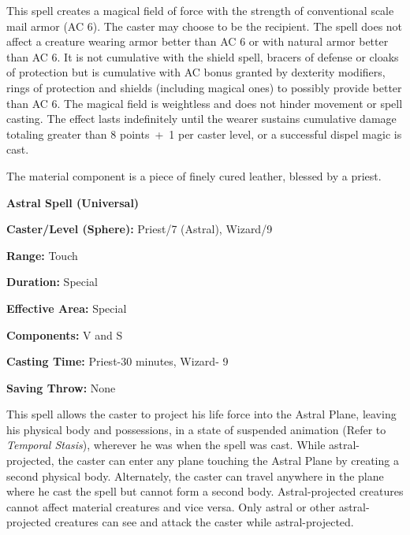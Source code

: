 \begin{multicols}{2}
This spell creates a magical field of force with the strength of conventional scale mail armor (AC 6).  The caster may choose to be the recipient.  The spell does not affect a creature wearing armor better than AC 6 or with natural armor better than AC 6.  It is not cumulative with the shield spell, bracers of defense or cloaks of protection but is cumulative with AC bonus granted by dexterity modifiers, rings of protection and shields (including magical ones) to possibly provide better than AC 6.  The magical field is weightless and does not hinder movement or spell casting.  The effect lasts indefinitely until the wearer sustains cumulative damage totaling greater than 8 points~+~1 per caster level, or a successful dispel magic is cast.  

The material component is a piece of finely cured leather, blessed by a priest.
 
\vspace{1em}

\noindent
\begin{minipage}{\columnwidth}

\noindent \textbf{Astral Spell (Universal)}

\noindent \textbf{Caster/Level (Sphere):} Priest/7 (Astral), Wizard/9

\noindent \textbf{Range:} Touch

\noindent \textbf{Duration:} Special

\noindent \textbf{Effective Area:} Special

\noindent \textbf{Components:} V and S

\noindent \textbf{Casting Time:} Priest-30 minutes, Wizard- 9 

\noindent \textbf{Saving Throw:} None

\end{minipage}

This spell allows the caster to project his life force into the Astral Plane, leaving his physical body and possessions, in a state of suspended animation (Refer to \textit{Temporal Stasis}), wherever he was when the spell was cast.  While astral-projected, the caster can enter any plane touching the Astral Plane by creating a second physical body.  Alternately, the caster can travel anywhere in the plane where he cast the spell but cannot form a second body.  Astral-projected creatures cannot affect material creatures and vice versa.  Only astral or other astral-projected creatures can see and attack the caster while astral-projected.


\end{multicols}
